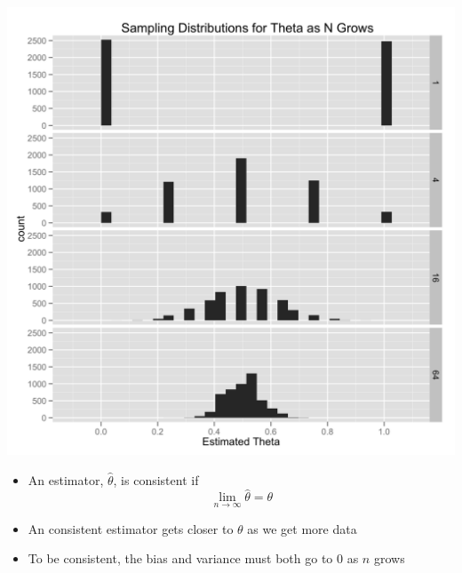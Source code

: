 \documentclass{beamer}
\begin{document}
\frame
{
  \begin{center}
    \includegraphics[scale = 0.1]{sampling_distribution.png}
  \end{center}
}

\frame
{
  \begin{itemize}
    \item{An estimator, $\hat{\theta}$, is consistent if}
    \[
    \lim_{n \to \infty} \hat{\theta} = \theta
    \]
    \item{An consistent estimator gets closer to $\theta$ as we get more data}
    \item{To be consistent, the bias and variance must both go to 0 as $n$ grows}
  \end{itemize}
}
\end{document}
